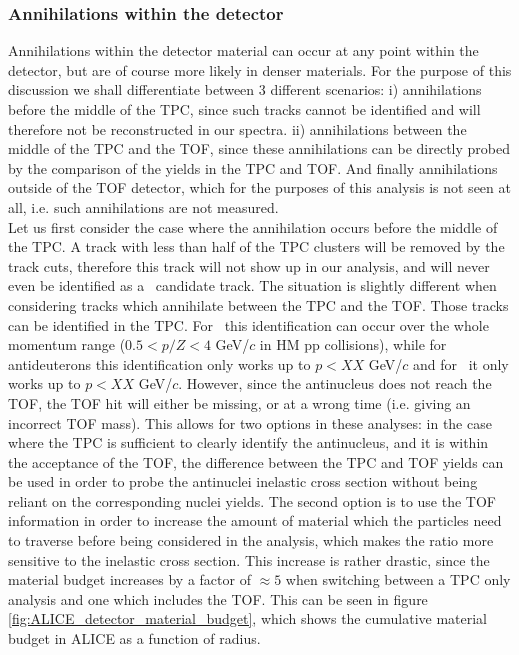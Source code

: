 \subsubsection{Annihilations within the detector}
Annihilations within the detector material can occur at any point within the detector, but are of course more likely in denser materials. For the purpose of this discussion we shall differentiate between 3 different scenarios: i) annihilations before the middle of the TPC, since such tracks cannot be identified and will therefore not be reconstructed in our spectra. ii) annihilations between the middle of the TPC and the TOF, since these annihilations can be directly probed by the comparison of the yields in the TPC and TOF. And finally annihilations outside of the TOF detector, which for the purposes of this analysis is not seen at all, i.e. such annihilations are not measured. \\

Let us first consider the case where the annihilation occurs before the middle of the TPC. A track with less than half of the TPC clusters will be removed by the track cuts, therefore this track will not show up in our analysis, and will never even be identified as a \ahe\ candidate track. The situation is slightly different when considering tracks which annihilate between the TPC and the TOF. Those tracks can be identified in the TPC. For \ahe\ this identification can occur over the whole momentum range ($0.5<p/Z<4$ GeV/$c$ in HM pp collisions), while for antideuterons this identification only works up to $p<XX$ GeV/$c$ and for \atrit\ it only works up to $p<XX$ GeV/$c$. However, since the antinucleus does not reach the TOF, the TOF hit will either be missing, or at a wrong time (i.e. giving an incorrect TOF mass). This allows for two options in these analyses: in the case where the TPC is sufficient to clearly identify the antinucleus, and it is within the acceptance of the TOF, the difference between the TPC and TOF yields can be used in order to probe the antinuclei inelastic cross section without being reliant on the corresponding nuclei yields. The second option is to use the TOF information in order to increase the amount of material which the particles need to traverse before being considered in the analysis, which makes the ratio more sensitive to the inelastic cross section. This increase is rather drastic, since the material budget increases by a factor of $\approx 5$ when switching between a TPC only analysis and one which includes the TOF. This can be seen in figure \ref{fig:ALICE_detector_material_budget}, which shows the cumulative material budget in ALICE as a function of radius. \\

